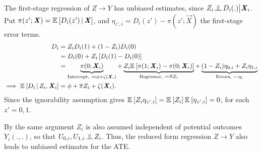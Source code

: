 The first-stage regression of $Z \to Y$ has unbiased estimates, since $Z_i \indep D_i(.) \big| \vec X_i$.
Put $\pi(z'; \boldsymbol{\mathit{X}}) = \mathbb{E}_{} \left[ D_i(z') \, \middle\vert \, \boldsymbol{\mathit{X}} \right]$, and $\eta_{z', i} = D_i(z') - \pi(z'; \vec X)$ the first-stage error terms.
\begin{align*}
    D_i &= Z_i D_i(1) + (1 - Z_i) D_i(0) \\
        &= D_i(0) +
            Z_i \left[ D_i(1) - D_i(0) \right] \\
        &= \underbrace{\pi(0; \boldsymbol{\mathit{X}}_i) 
        }_{\text{Intercept, } \coloneqq \phi + \zeta(\boldsymbol{\mathit{X}}_i)} +
            \underbrace{Z_i \mathbb{E}_{} \left[  \pi(1; \boldsymbol{\mathit{X}}_i) - \pi(0; \boldsymbol{\mathit{X}}_i) \right]}_{
                \text{Regressor, } \coloneqq \overline{\pi} Z_i }
        + \underbrace{(1- Z_i) \eta_{0,i} + Z_i \eta_{1,i}}_{
            \text{Errors, } \coloneqq \eta_i} \\
    \implies \mathbb{E}_{} \left[ D_i \, \middle\vert \, Z_i, \boldsymbol{\mathit{X}}_i \right]
        &= \phi + \overline{\pi} Z_i + \zeta(\boldsymbol{\mathit{X}}_i).
\end{align*}
Since the ignorability assumption gives $\mathbb{E}_{} \left[ Z_i \eta_{z',i} \right] = \mathbb{E}_{} \left[ Z_i \right] \mathbb{E}_{} \left[ \eta_{z',i} \right] = 0$, for each $z' =0,1$.

By the same argument $Z_i$ is also assumed independent of potential outcomes $Y_i(.,.)$, so that $U_{0,i}, U_{1,i} \indep Z_i$.
Thus, the reduced form regression $Z \to Y$ also leads to unbiased estimates for the ATE.

